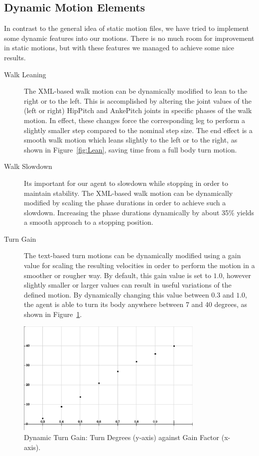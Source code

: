 \subsection{Dynamic Motion Elements}
In contrast to the general idea of static motion files, we have tried to implement some dynamic features into our motions. There is no much room for improvement in static motions, but with these features we managed to achieve some nice results.
\begin{description}
	\item[Walk Leaning] The XML-based walk motion can be dynamically modified to lean to the right or to the left. This is accomplished by altering the joint values of the (left or right) HipPitch and AnkePitch joints in specific phases of the walk motion. In effect, these changes force the corresponding leg to perform a slightly smaller step compared to the nominal step size. The end effect is a smooth walk motion which leans slightly to the left or to the right, as shown in Figure~\ref{fig:Lean}, saving time from a full body turn motion.
	\item[Walk Slowdown] Its important for our agent to slowdown while stopping in order to maintain stability. The XML-based walk motion can be dynamically modified by scaling the phase durations in order to achieve such a slowdown. Increasing the phase durations dynamically by about 35\% yields a smooth approach to a stopping position. 
	\item[Turn Gain] The text-based turn motions can be dynamically modified using a gain value for scaling the resulting velocities in order to perform the motion in a smoother or rougher way. By default, this gain value is set to $1.0$, however slightly smaller or larger values can result in useful variations of the defined motion. By dynamically changing this value between $0.3$ and $1.0$, the agent is able to turn its body anywhere between 7 and 40 degrees, as shown in Figure~\ref{fig:Turn}.
\end{description} 




\begin{figure}[t!]
\centering
  \includegraphics[width=0.8\textwidth]{Chapter3/figures/DynamicTurn.pdf}
  \caption{Dynamic Turn Gain: Turn Degrees (y-axis) against Gain Factor (x-axis).}
  \label{fig:Turn}
\end{figure}


